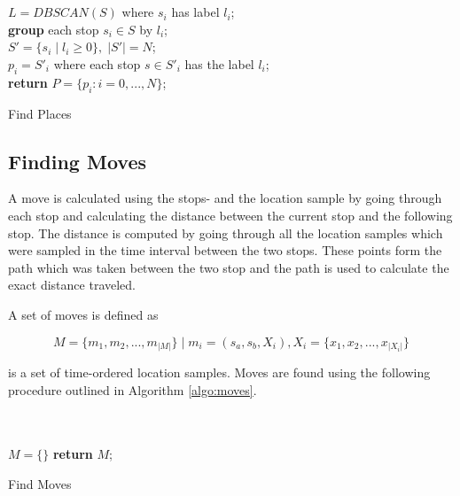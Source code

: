 \begin{algorithm}[H]
\SetAlgoLined
{}\\
\\
    $L = DBSCAN(S)$ where $s_i$ has label $l_i$;\\
    \textbf{group} each stop $s_i \in S$ by $l_i$;\\
    $S' = \{s_i \;|\; l_i \geq 0\}, \;|S'| = N$;\\
    $p_i = S'_i$ where each stop $s \in S'_i$ has the label $l_i$;\\
    \textbf{return} $P = \{p_i : i = 0, ..., N\}$;\\
 \label{algo:places}
 \caption{Find Places}
\end{algorithm}

\subsection{Finding Moves}
A move is calculated using the stops- and the location sample by going through each stop and calculating the distance between the current stop and the following stop. The distance is computed by going through all the location samples which were sampled in the time interval between the two stops. These points form the path which was taken between the two stop and the path is used to calculate the exact distance traveled.

A set of moves is defined as 

\begin{equation}
\label{eq:feature-moves}
M = \{m_1, m_2, ..., m_{|M|}\} \;| \; m_i = (s_a, s_b, X_i), X_i = \{x_1, x_2, ..., x_{|X_i|}\}
\end{equation}

is a set of time-ordered location samples. Moves are found using the following procedure outlined in Algorithm \ref{algo:moves}.

\begin{algorithm}[H]
\SetAlgoLined
{}\\
\\
    $M = \{ \}$\;
    \textbf{return} $M$;
 \label{algo:moves}
 \caption{Find Moves}
\end{algorithm}


